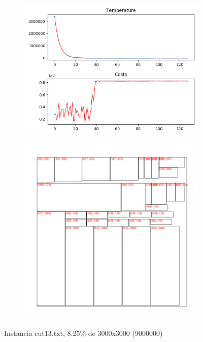 \begin{figure}
\centering
\begin{subfigure}{.5\textwidth}
  \centering
  \includegraphics[width=1\linewidth]{results/cut13/3/plot}
  \label{fig:sub1}
\end{subfigure}%
\begin{subfigure}{.5\textwidth}
  \centering
  \includegraphics[width=1\linewidth]{results/cut13/3/cut}
  \label{fig:sub2}
\end{subfigure}
\caption{Instancia cut13.txt, 8.25\% de 3000x3000 (9000000)}
\label{fig:test}
\end{figure}


